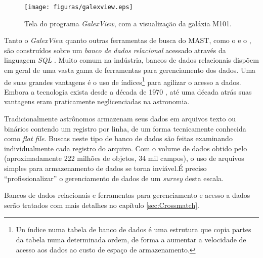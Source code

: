 \begin{figure}
	\texttt{[image: figuras/galexview.eps]}
	\caption[Tela do programa{\em GalexView}.]
	{Tela do programa {\em GalexView}, com a visualização da galáxia M101.}
	\label{fig:GalexView}
\end{figure}

Tanto o {\em GalexView} quanto outras ferramentas de busca do MAST, como o
 e o , são construídos sobre um
{\em banco de dados relacional} acessado através da linguagem {\em SQL}
\citep{Chamberlin1974}. Muito comum na indústria, bancos de dados relacionais
dispõem em geral de uma vasta gama de ferramentas para gerenciamento dos dados.
Uma de suas grandes vantagens é o uso de índices\footnote{Un índice numa tabela
de banco de dados é uma estrutura que copia partes da tabela numa determinada
ordem, de forma a aumentar a velocidade de acesso aos dados ao custo de espaço
de armazenamento.} para agilizar o acesso a dados. Embora a tecnologia exista
desde a década de 1970 \citep{Codd1970}, até uma década atrás suas vantagens
eram praticamente neglicenciadas na astronomia.

Tradicionalmente astrônomos armazenam seus dados em arquivos texto ou binários
contendo um registro por linha, de um forma tecnicamente conhecida como {\em
flat file}. Buscas neste tipo de banco de dados são feitas examinando
individualmente cada registro do arquivo. Com o volume de dados obtido pelo
\galex (aproximadamente 222 milhões de objetos, 34 mil campos)\citneed, o uso de
arquivos simples para armazenamento de dados se torna inviável.\citneed É
preciso ``profissionalizar'' o gerenciamento de dados de um {\em survey} desta
escala.

Bancos de dados relacionais e ferramentas para gerenciamento e acesso a dados
serão tratados com mais detalhes no capítulo \ref{sec:Crossmatch}.


